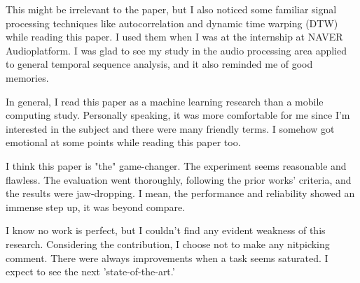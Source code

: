 \documentclass[10pt,a4paper]{article}
\begin{document}
	This might be irrelevant to the paper, but I also noticed some familiar signal processing techniques like autocorrelation and dynamic time warping (DTW) while reading this paper. I used them when I was at the internship at NAVER Audioplatform. I was glad to see my study in the audio processing area applied to general temporal sequence analysis, and it also reminded me of good memories.
	
	In general, I read this paper as a machine learning research than a mobile computing study. Personally speaking, it was more comfortable for me since I'm interested in the subject and there were many friendly terms. I somehow got emotional at some points while reading this paper too.
	
	I think this paper is "the" game-changer. The experiment seems reasonable and flawless. The evaluation went thoroughly, following the prior works' criteria, and the results were jaw-dropping. I mean, the performance and reliability showed an immense step up, it was beyond compare.
	
	I know no work is perfect, but I couldn't find any evident weakness of this research. Considering the contribution, I choose not to make any nitpicking comment. There were always improvements when a task seems saturated. I expect to see the next 'state-of-the-art.'
	
\end{document}

